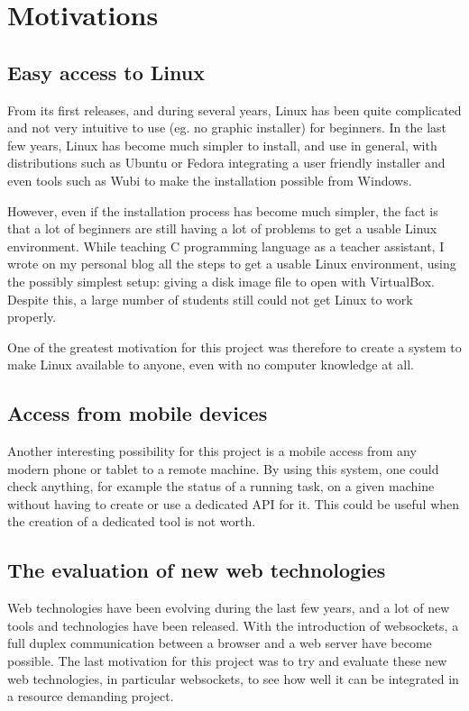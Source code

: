 \section{Motivations}
\subsection{Easy access to Linux}
From its first releases, and during several years, Linux has been quite 
complicated and not very intuitive to use (eg. no graphic installer) for beginners.
In the last few years, Linux has become much simpler to install, and use in general, 
with distributions such as Ubuntu or Fedora integrating a user friendly installer 
and even tools such as Wubi to make the installation possible from Windows.

However, even if the installation process has become much simpler, the fact is that 
a lot of beginners are still having a lot of problems to get a usable Linux environment. While teaching C programming language as a teacher assistant, I wrote 
on my personal blog all the steps to get a usable Linux environment, using the 
possibly simplest setup: giving a disk image file to open with VirtualBox. 
Despite this, a large number of students still could not get Linux to work properly.

One of the greatest motivation for this project was therefore to create a system to 
make Linux available to anyone, even with no computer knowledge at all.
%
\subsection{Access from mobile devices}
Another interesting possibility for this project is a mobile access from any modern 
phone or tablet to a remote machine. By using this system, one could check anything,
for example the status of a running task,  on a given machine without having 
to create or use a dedicated API for it. This could be useful when the creation of 
a dedicated tool is not worth.
%
\subsection{The evaluation of new web technologies }
Web technologies have been evolving during the last few years, and a lot 
of new tools and technologies have been released. With the introduction of 
websockets, a full duplex communication between a browser and a web server 
have become possible. 
The last motivation for this project was to try and evaluate these new web 
technologies, in particular websockets, to see how well it can be integrated 
in a resource demanding project.

